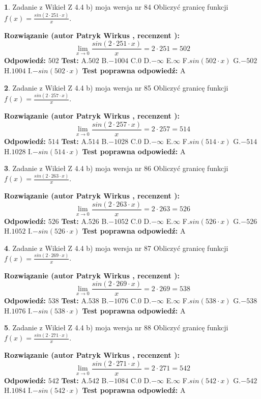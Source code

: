\documentclass[12pt, a4paper]{article}
\theoremstyle{definition} %
\newtheorem{zad}{}
\newcommand{\zadStart}[1]{\begin{zad}#1\newline}
\newcommand{\zadStop}{\end{zad}}
\newcommand{\rozwStart}[2]{\noindent \textbf{Rozwiązanie (autor #1 , recenzent #2): }\newline}
\newcommand{\rozwStop}{\newline}
\newcommand{\odpStart}{\noindent \textbf{Odpowiedź:}\newline}
\newcommand{\odpStop}{\newline}
\newcommand{\testStart}{\noindent \textbf{Test:}\newline}
\newcommand{\testStop}{\newline}
\newcommand{\kluczStart}{\noindent \textbf{Test poprawna odpowiedź:}\newline}
\newcommand{\kluczStop}{\newline}
\begin{document}
\zadStart{Zadanie z Wikieł Z 4.4 b) moja wersja nr 84}
Obliczyć granicę funkcji $f(x)=\frac{sin(2 \cdot251\cdot x)}{x}$.
\zadStop
\rozwStart{Patryk Wirkus}{}
$$\lim\limits_{x\to 0}\frac{sin(2 \cdot 251\cdot x)}{x}=
2 \cdot 251 = 502$$
\rozwStop
\odpStart
$502$
\odpStop
\testStart
A.$502$
B.$-1004$
C.$0$
D.$-\infty$
E.$\infty$
F.$sin(502\cdot x)$
G.$-502$
H.$1004$
I.$-sin(502\cdot x)$
\testStop
\kluczStart
A
\kluczStop



\zadStart{Zadanie z Wikieł Z 4.4 b) moja wersja nr 85}
Obliczyć granicę funkcji $f(x)=\frac{sin(2 \cdot257\cdot x)}{x}$.
\zadStop
\rozwStart{Patryk Wirkus}{}
$$\lim\limits_{x\to 0}\frac{sin(2 \cdot 257\cdot x)}{x}=
2 \cdot 257 = 514$$
\rozwStop
\odpStart
$514$
\odpStop
\testStart
A.$514$
B.$-1028$
C.$0$
D.$-\infty$
E.$\infty$
F.$sin(514\cdot x)$
G.$-514$
H.$1028$
I.$-sin(514\cdot x)$
\testStop
\kluczStart
A
\kluczStop



\zadStart{Zadanie z Wikieł Z 4.4 b) moja wersja nr 86}
Obliczyć granicę funkcji $f(x)=\frac{sin(2 \cdot263\cdot x)}{x}$.
\zadStop
\rozwStart{Patryk Wirkus}{}
$$\lim\limits_{x\to 0}\frac{sin(2 \cdot 263\cdot x)}{x}=
2 \cdot 263 = 526$$
\rozwStop
\odpStart
$526$
\odpStop
\testStart
A.$526$
B.$-1052$
C.$0$
D.$-\infty$
E.$\infty$
F.$sin(526\cdot x)$
G.$-526$
H.$1052$
I.$-sin(526\cdot x)$
\testStop
\kluczStart
A
\kluczStop



\zadStart{Zadanie z Wikieł Z 4.4 b) moja wersja nr 87}
Obliczyć granicę funkcji $f(x)=\frac{sin(2 \cdot269\cdot x)}{x}$.
\zadStop
\rozwStart{Patryk Wirkus}{}
$$\lim\limits_{x\to 0}\frac{sin(2 \cdot 269\cdot x)}{x}=
2 \cdot 269 = 538$$
\rozwStop
\odpStart
$538$
\odpStop
\testStart
A.$538$
B.$-1076$
C.$0$
D.$-\infty$
E.$\infty$
F.$sin(538\cdot x)$
G.$-538$
H.$1076$
I.$-sin(538\cdot x)$
\testStop
\kluczStart
A
\kluczStop



\zadStart{Zadanie z Wikieł Z 4.4 b) moja wersja nr 88}
Obliczyć granicę funkcji $f(x)=\frac{sin(2 \cdot271\cdot x)}{x}$.
\zadStop
\rozwStart{Patryk Wirkus}{}
$$\lim\limits_{x\to 0}\frac{sin(2 \cdot 271\cdot x)}{x}=
2 \cdot 271 = 542$$
\rozwStop
\odpStart
$542$
\odpStop
\testStart
A.$542$
B.$-1084$
C.$0$
D.$-\infty$
E.$\infty$
F.$sin(542\cdot x)$
G.$-542$
H.$1084$
I.$-sin(542\cdot x)$
\testStop
\kluczStart
A
\kluczStop
\end{document}
